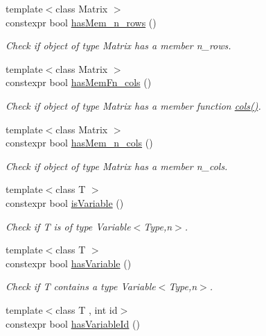 \begin{DoxyCompactItemize}
{\footnotesize template$<$class Matrix $>$ }\\constexpr bool \hyperlink{namespaceFunG_1_1Checks_a6f66adbc63ed46140f1080e9914cb5de}{has\+Mem\+\_\+n\+\_\+rows} ()
\begin{DoxyCompactList}\small\item\em Check if object of type Matrix has a member n\+\_\+rows. \end{DoxyCompactList}\item 
{\footnotesize template$<$class Matrix $>$ }\\constexpr bool \hyperlink{namespaceFunG_1_1Checks_a4979df2d7b7abebb0253a569e41274b1}{has\+Mem\+Fn\+\_\+cols} ()
\begin{DoxyCompactList}\small\item\em Check if object of type Matrix has a member function \hyperlink{namespaceFunG_1_1LinearAlgebra_ae981b8bee32eea3ce87f41874835c9c1}{cols()}. \end{DoxyCompactList}\item 
{\footnotesize template$<$class Matrix $>$ }\\constexpr bool \hyperlink{namespaceFunG_1_1Checks_a0a87aaa714499abcaabd921297be61e4}{has\+Mem\+\_\+n\+\_\+cols} ()
\begin{DoxyCompactList}\small\item\em Check if object of type Matrix has a member n\+\_\+cols. \end{DoxyCompactList}\item 
{\footnotesize template$<$class T $>$ }\\constexpr bool \hyperlink{namespaceFunG_1_1Checks_ac2a1a8aedf54c42cb6d47b3b64bbc761}{is\+Variable} ()
\begin{DoxyCompactList}\small\item\em Check if T is of type Variable$<$\+Type,n$>$. \end{DoxyCompactList}\item 
{\footnotesize template$<$class T $>$ }\\constexpr bool \hyperlink{namespaceFunG_1_1Checks_a6d289274975a662346a1b5adf0d31f37}{has\+Variable} ()
\begin{DoxyCompactList}\small\item\em Check if T contains a type Variable$<$\+Type,n$>$. \end{DoxyCompactList}\item 
{\footnotesize template$<$class T , int id$>$ }\\constexpr bool \hyperlink{namespaceFunG_1_1Checks_a0d42132679e0563893cc6c1809dc9a55}{has\+Variable\+Id} ()

\end{DoxyCompactItemize}
